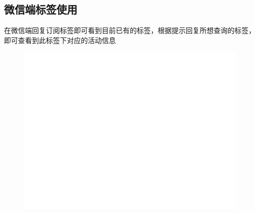 \documentclass[UTF8]{ctexart}
\begin{document}
\newpage
\subsection{微信端标签使用}

在微信端回复订阅标签即可看到目前已有的标签，根据提示回复所想查询的标签，即可查看到此标签下对应的活动信息

\begin{figure}[h]
    \centering
    \includegraphics[width=\textwidth]{manual_images//temp.png}
\end{figure}
\end{document}
